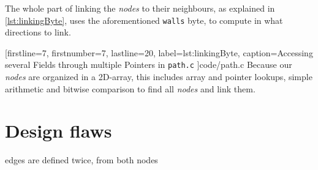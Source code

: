 The whole part of linking the \emph{nodes} to their neighbours,
as explained in \ref{lst:linkingByte},
uses the aforementioned {\tt walls} byte,
to compute in what directions to link.


[firstline=7,				%
firstnumber=7,
lastline=20,
label=lst:linkingByte,	%
caption={Accessing several Fields through multiple Pointers in {\tt path.c}}
]{code/path.c}
%
Because our \emph{nodes} are organized in a 2D-array,
this includes array and pointer lookups,
simple arithmetic and
bitwise comparison
to find all \emph{nodes} and link them.

\section{Design flaws}
edges are defined twice, from both nodes
